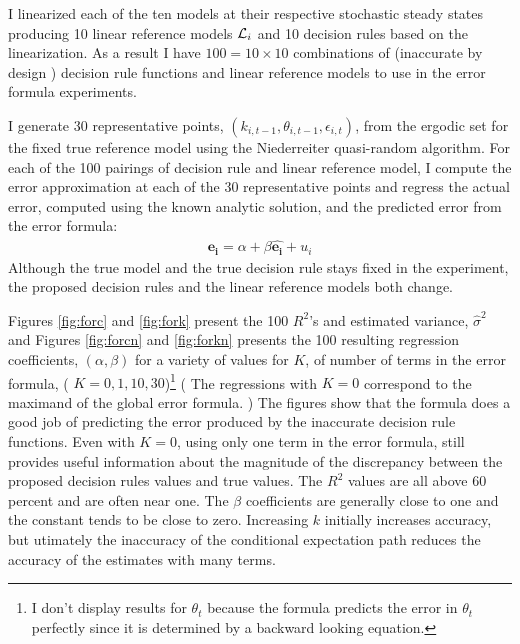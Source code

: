 \documentclass[12pt]{article}
\begin{document}
\vspace{.2in}



I linearized each of the ten models at their respective stochastic steady
states producing 10 linear reference models ${\mathcal{L}}_i$ and 10 decision rules
based on the linearization. 
As a result I have $100=10 \times 10$ combinations of (inaccurate by design ) decision rule functions
 and
linear reference models to use in the error formula experiments.


I generate 30 representative points, $(k_{i,t-1},\theta_{i,t-1},\epsilon_{i,t})$, from the ergodic set for the fixed true reference model
using the Niederreiter quasi-random algorithm.
For each of the 100 pairings of decision rule and linear reference model,
I compute the error approximation at each of the 30 representative points
and regress the actual error, computed using the known analytic solution, and the predicted error from the error formula:
\begin{gather*}
  \mathbf{e_i}=\alpha + \beta   \hat{\mathbf{e_i}} +u_i
\end{gather*}
Although the true model and the true decision rule stays 
fixed in the experiment, the
  proposed decision rules and the linear reference models both change.

Figures \ref{fig:forc} and \ref{fig:fork}  present the 100 $R^2$'s and estimated variance, $\hat{\sigma}^2$ and Figures \ref{fig:forcn} and \ref{fig:forkn} presents the 100 resulting regression coefficients, $ (\alpha,\beta)$ for a variety of values for $K$, of number of terms in the 
error formula, ( $K=0, 1, 10, 30$)\footnote{I don't display results for $\theta_t$ because the formula predicts the error 
in $\theta_t$ perfectly since it is determined by a backward looking equation.}
( The regressions with $K=0$ correspond to the maximand of the
global error formula. ) The figures show that
the formula does a good job of predicting the error produced by the 
inaccurate decision rule functions.
Even with $K=0$, using only one term in the error formula,
 still provides 
useful information about the magnitude of the discrepancy between the 
proposed decision rules values and true values.  The $R^2$ values are all above 60 percent and are often near one.  The $\beta$ coefficients are generally  close to one and the 
constant tends to be close to zero. {\color{blue} Increasing $k$ initially increases accuracy,
but utimately the inaccuracy of the conditional expectation path reduces
the accuracy of the estimates with many terms.}
\end{document}

